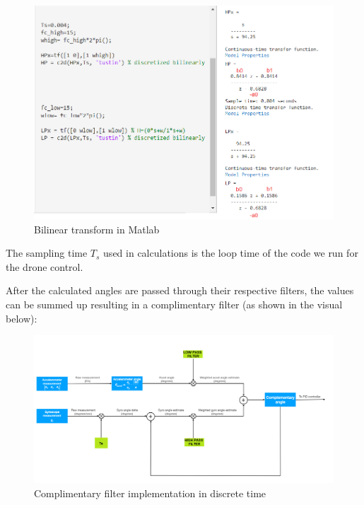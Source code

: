 \begin{figure}[H]
    \begin{center}
    \includegraphics[scale = 0.5]{pictures/IMU/filters_matlab.png}
    \end{center}
    \caption{Bilinear transform in Matlab}
    \label{fig:my_label}
\end{figure}



The sampling time $T_s$ used in calculations is the loop time of the code we run for the drone control.


After the calculated angles are passed through their respective filters, the values can be summed up resulting in a complimentary filter (as shown in the visual below):


\begin{figure}[H]
    \begin{center}
    \includegraphics[scale = 0.5]{pictures/IMU/complementary.png}
    \end{center}
    \caption{Complimentary filter implementation in discrete time}
    \label{fig:my_label}
\end{figure}

